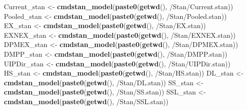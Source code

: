 \documentclass[
]{article}
\newenvironment{Shaded}{\begin{snugshade}}{\end{snugshade}}
\newcommand{\FunctionTok}[1]{\textcolor[rgb]{0.13,0.29,0.53}{\textbf{#1}}}
\newcommand{\NormalTok}[1]{#1}
\newcommand{\OtherTok}[1]{\textcolor[rgb]{0.56,0.35,0.01}{#1}}
\newcommand{\StringTok}[1]{\textcolor[rgb]{0.31,0.60,0.02}{#1}}
\begin{document}
\begin{Shaded}
\begin{Highlighting}[]
\NormalTok{Current\_stan }\OtherTok{\textless{}{-}} \FunctionTok{cmdstan\_model}\NormalTok{(}\FunctionTok{paste0}\NormalTok{(}\FunctionTok{getwd}\NormalTok{(), }\StringTok{\textquotesingle{}/Stan/Current.stan\textquotesingle{}}\NormalTok{))}
\NormalTok{Pooled\_stan  }\OtherTok{\textless{}{-}} \FunctionTok{cmdstan\_model}\NormalTok{(}\FunctionTok{paste0}\NormalTok{(}\FunctionTok{getwd}\NormalTok{(), }\StringTok{\textquotesingle{}/Stan/Pooled.stan\textquotesingle{}}\NormalTok{))}
\NormalTok{EX\_stan      }\OtherTok{\textless{}{-}} \FunctionTok{cmdstan\_model}\NormalTok{(}\FunctionTok{paste0}\NormalTok{(}\FunctionTok{getwd}\NormalTok{(), }\StringTok{\textquotesingle{}/Stan/EX.stan\textquotesingle{}}\NormalTok{))}
\NormalTok{EXNEX\_stan   }\OtherTok{\textless{}{-}} \FunctionTok{cmdstan\_model}\NormalTok{(}\FunctionTok{paste0}\NormalTok{(}\FunctionTok{getwd}\NormalTok{(), }\StringTok{\textquotesingle{}/Stan/EXNEX.stan\textquotesingle{}}\NormalTok{))}
\NormalTok{DPMEX\_stan   }\OtherTok{\textless{}{-}} \FunctionTok{cmdstan\_model}\NormalTok{(}\FunctionTok{paste0}\NormalTok{(}\FunctionTok{getwd}\NormalTok{(), }\StringTok{\textquotesingle{}/Stan/DPMEX.stan\textquotesingle{}}\NormalTok{))}
\NormalTok{DMPP\_stan    }\OtherTok{\textless{}{-}} \FunctionTok{cmdstan\_model}\NormalTok{(}\FunctionTok{paste0}\NormalTok{(}\FunctionTok{getwd}\NormalTok{(), }\StringTok{\textquotesingle{}/Stan/DMPP.stan\textquotesingle{}}\NormalTok{))}
\NormalTok{UIPDir\_stan  }\OtherTok{\textless{}{-}} \FunctionTok{cmdstan\_model}\NormalTok{(}\FunctionTok{paste0}\NormalTok{(}\FunctionTok{getwd}\NormalTok{(), }\StringTok{\textquotesingle{}/Stan/UIPDir.stan\textquotesingle{}}\NormalTok{))}
\NormalTok{HS\_stan      }\OtherTok{\textless{}{-}} \FunctionTok{cmdstan\_model}\NormalTok{(}\FunctionTok{paste0}\NormalTok{(}\FunctionTok{getwd}\NormalTok{(), }\StringTok{\textquotesingle{}/Stan/HS.stan\textquotesingle{}}\NormalTok{))}
\NormalTok{DL\_stan      }\OtherTok{\textless{}{-}} \FunctionTok{cmdstan\_model}\NormalTok{(}\FunctionTok{paste0}\NormalTok{(}\FunctionTok{getwd}\NormalTok{(), }\StringTok{\textquotesingle{}/Stan/DL.stan\textquotesingle{}}\NormalTok{))}
\NormalTok{SS\_stan      }\OtherTok{\textless{}{-}} \FunctionTok{cmdstan\_model}\NormalTok{(}\FunctionTok{paste0}\NormalTok{(}\FunctionTok{getwd}\NormalTok{(), }\StringTok{\textquotesingle{}/Stan/SS.stan\textquotesingle{}}\NormalTok{))}
\NormalTok{SSL\_stan     }\OtherTok{\textless{}{-}} \FunctionTok{cmdstan\_model}\NormalTok{(}\FunctionTok{paste0}\NormalTok{(}\FunctionTok{getwd}\NormalTok{(), }\StringTok{\textquotesingle{}/Stan/SSL.stan\textquotesingle{}}\NormalTok{))}
\end{Highlighting}
\end{Shaded}
\end{document}
